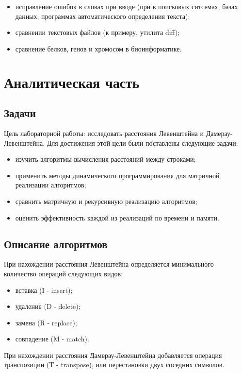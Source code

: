 \documentclass[12pt]{report}
\begin{document}
	\begin{itemize}
		\item исправление ошибок в словах при вводе (при в поисковых ситсемах, базах данных, программах автоматического определения текста);
		\item сравнении текстовых файлов (к примеру, утилита diff);
		\item сравнение белков, генов и хромосом в биоинформатике.
	\end{itemize}

    \chapter{Аналитическая часть}

	 \section{Задачи}
	Цель лабораторной работы: исследовать расстояния Левенштейна и Дамерау-Левенштейна. Для достижения этой цели были поставлены следующие задачи: 
	\begin{itemize}
		\item изучить алгоритмы вычисления расстояний между строками;
		\item применить методы динамического программирования для матричной реализации алгоритмов;
		\item сравнить матричную и рекурсивную реализацию алгоритмов;
		\item оценить эффективность каждой из реализаций по времени и памяти.
	\end{itemize}

	 \section{Описание алгоритмов}
    При нахождении расстояния Левенштейна определяется минимального количество операций следующих видов:
	\begin{itemize}
		\item вставка (I - insert);
		\item удаление (D - delete);
		\item замена (R - replace);
		\item совпадение (M - match).	
	\end{itemize}
	При нахождении расстояния Дамерау-Левенштейна добавляется операция транспозиции (T - transpose), или перестановки двух соседних символов.\\
\end{document}
